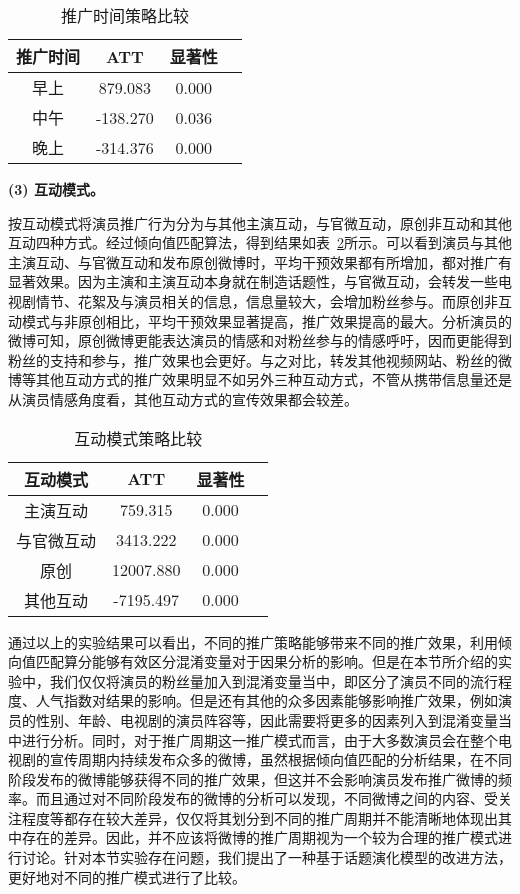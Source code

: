 \begin{table}[h]
\centering
\caption{推广时间策略比较}
\label{r2}
\begin{tabular}{|c|c|c|c|} \hline
推广时间& ATT & 显著性\\ \hline
早上 & 879.083& 0.000\\ \hline
中午 & -138.270& 0.036\\ \hline
晚上 & -314.376 & 0.000\\ 
\hline\end{tabular}

\end{table}

\textbf{(3) 互动模式。}

按互动模式将演员推广行为分为与其他主演互动，与官微互动，原创非互动和其他互动四种方式。经过倾向值匹配算法，得到结果如表~\ref{r3}所示。可以看到演员与其他主演互动、与官微互动和发布原创微博时，平均干预效果都有所增加，都对推广有显著效果。因为主演和主演互动本身就在制造话题性，与官微互动，会转发一些电视剧情节、花絮及与演员相关的信息，信息量较大，会增加粉丝参与。而原创非互动模式与非原创相比，平均干预效果显著提高，推广效果提高的最大。分析演员的微博可知，原创微博更能表达演员的情感和对粉丝参与的情感呼吁，因而更能得到粉丝的支持和参与，推广效果也会更好。与之对比，转发其他视频网站、粉丝的微博等其他互动方式的推广效果明显不如另外三种互动方式，不管从携带信息量还是从演员情感角度看，其他互动方式的宣传效果都会较差。

\begin{table}[h]
\centering
\caption{互动模式策略比较}
\label{r3}
\begin{tabular}{|c|c|c|c|} \hline
互动模式& ATT & 显著性\\ \hline
主演互动  & 759.315& 0.000\\ \hline
与官微互动 & 3413.222& 0.000\\ \hline
原创  & 12007.880& 0.000\\ \hline
其他互动 & -7195.497 & 0.000\\ 
\hline\end{tabular}
\end{table}

通过以上的实验结果可以看出，不同的推广策略能够带来不同的推广效果，利用倾向值匹配算分能够有效区分混淆变量对于因果分析的影响。但是在本节所介绍的实验中，我们仅仅将演员的粉丝量加入到混淆变量当中，即区分了演员不同的流行程度、人气指数对结果的影响。但是还有其他的众多因素能够影响推广效果，例如演员的性别、年龄、电视剧的演员阵容等，因此需要将更多的因素列入到混淆变量当中进行分析。同时，对于推广周期这一推广模式而言，由于大多数演员会在整个电视剧的宣传周期内持续发布众多的微博，虽然根据倾向值匹配的分析结果，在不同阶段发布的微博能够获得不同的推广效果，但这并不会影响演员发布推广微博的频率。而且通过对不同阶段发布的微博的分析可以发现，不同微博之间的内容、受关注程度等都存在较大差异，仅仅将其划分到不同的推广周期并不能清晰地体现出其中存在的差异。因此，并不应该将微博的推广周期视为一个较为合理的推广模式进行讨论。针对本节实验存在问题，我们提出了一种基于话题演化模型的改进方法，更好地对不同的推广模式进行了比较。

